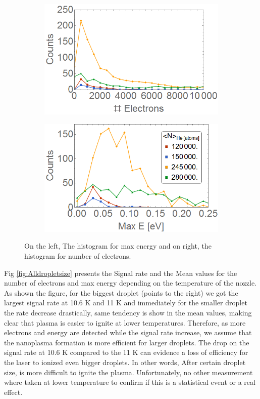 \begin{figure}[h!]
\centering
\begin{subfigure}[l]{0.49\textwidth}
\includegraphics[width=1\textwidth]{../Images/results/Mir_He_Dropletsize/Helec.png} 
\end{subfigure}
\begin{subfigure}[l]{0.49\textwidth}
\includegraphics[width=1\textwidth]{../Images/results/Mir_He_Dropletsize/Henerg.png}   				\end{subfigure}
\caption[MIR He droplet scan histograms]{On the left, The histogram for max energy and on right, the histogram for number of electrons.}
\label{fig:histodropletsize}
\end{figure}

Fig \ref{fig:Alldropletsize} presents the Signal rate and the Mean values for the number of electrons and max energy depending on the temperature of the nozzle. As shown the figure, for the biggest droplet (points to the right) we got the largest signal rate at 10.6 K and 11 K and immediately for the smaller droplet the rate decrease drastically, same tendency is show in the mean values, making clear that plasma is easier to ignite at lower temperatures. Therefore, as more electrons and energy are detected while the signal rate increase, we assume that the nanoplasma formation is more efficient for larger droplets. The drop on the signal rate at 10.6 K compared to the 11 K can evidence a loss of efficiency for the laser to ionized even bigger droplets. In other words, After certain droplet size, is more difficult to ignite the plasma.  Unfortunately, no other measurement where taken at lower temperature to confirm if this is a statistical event or a real effect.


